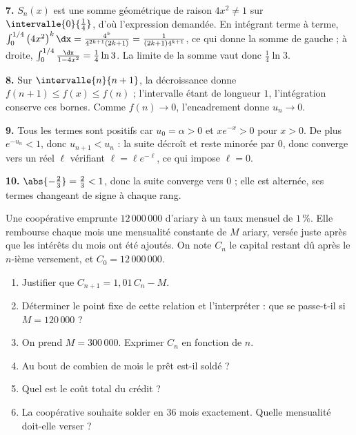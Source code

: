 \begin{corrige}[annales]
\textbf{7.} $S_{n}(x)$ est une somme géométrique de raison $4x^{2} \neq 1$ sur
$\intervalle{0}{\frac14}$, d'où l'expression demandée. En intégrant terme à
terme, $\int_{0}^{1/4}\left(4x^{2}\right)^{k}\dx
= \frac{4^{k}}{4^{2k+1}(2k+1)} = \frac{1}{(2k+1)4^{k+1}}$, ce qui donne la
somme de gauche ; à droite, $\int_{0}^{1/4}\frac{\dx}{1-4x^{2}}
= \frac14\ln3$. La limite de la somme vaut donc $\frac14\ln3$.

\textbf{8.} Sur $\intervalle{n}{n+1}$, la décroissance donne
$f(n+1) \leq f(x) \leq f(n)$ ; l'intervalle étant de longueur $1$,
l'intégration conserve ces bornes. Comme $f(n) \to 0$, l'encadrement donne
$u_{n} \to 0$.

\textbf{9.} Tous les termes sont positifs car $u_{0} = \alpha>0$ et
$xe^{-x}>0$ pour $x>0$. De plus $e^{-u_{n}}<1$, donc $u_{n+1}<u_{n}$ : la
suite décroît et reste minorée par $0$, donc converge vers un réel $\ell$
vérifiant $\ell = \ell e^{-\ell}$, ce qui impose $\ell = 0$.

\textbf{10.} $\abs{-\frac23} = \frac23<1$, donc la suite converge vers $0$ ;
elle est alternée, ses termes changeant de signe à chaque rang.
\end{corrige}

\begin{jecherche}
Une coopérative emprunte $12\,000\,000$ d'ariary à un taux mensuel de
$1\,\%$. Elle rembourse chaque mois une mensualité constante de $M$ ariary,
versée juste après que les intérêts du mois ont été ajoutés. On note $C_{n}$
le capital restant dû après le $n$-ième versement, et $C_{0} = 12\,000\,000$.

\begin{enumerate}[label=\textbf{\arabic*.}, leftmargin=*, itemsep=0.3em]
  \item Justifier que $C_{n+1} = 1{,}01\,C_{n}-M$.
  \item Déterminer le point fixe de cette relation et l'interpréter : que se
        passe-t-il si $M = 120\,000$ ?
  \item On prend $M = 300\,000$. Exprimer $C_{n}$ en fonction de $n$.
  \item Au bout de combien de mois le prêt est-il soldé ?
  \item Quel est le coût total du crédit ?
  \item La coopérative souhaite solder en $36$ mois exactement. Quelle
        mensualité doit-elle verser ?
\end{enumerate}
\end{jecherche}

